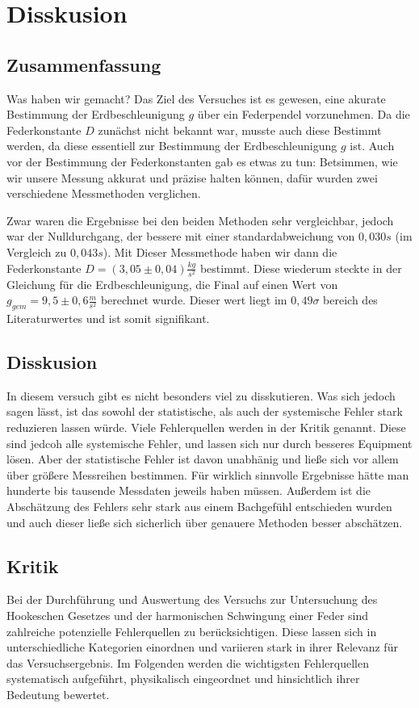 \chapter{Disskusion}

\section{Zusammenfassung}
Was haben wir gemacht? Das Ziel des Versuches ist es gewesen, eine akurate Bestimmung der Erdbeschleunigung $g$ über ein Federpendel vorzunehmen. 
Da die Federkonstante $D$ zunächst nicht bekannt war, musste auch diese Bestimmt werden, da diese essentiell zur Bestimmung der Erdbeschleunigung $g$ ist.
Auch vor der Bestimmung der Federkonstanten gab es etwas zu tun: Betsimmen, wie wir unsere Messung akkurat und präzise halten können, dafür wurden zwei verschiedene Messmethoden verglichen.

Zwar waren die Ergebnisse bei den beiden Methoden sehr vergleichbar, jedoch war der Nulldurchgang, der bessere mit einer standardabweichung von $0,030s$ (im Vergleich zu $0,043s$). 
Mit Dieser Messmethode haben wir dann die Federkonstante $D = (3,05 \pm 0,04) \frac{kg}{s^2}$ bestimmt. 
Diese wiederum steckte in der Gleichung für die Erdbeschleunigung, die Final auf einen Wert von $g_{gem} = 9,5 \pm 0,6 \frac{m}{s^2}$ berechnet wurde.
Dieser wert liegt im $0,49 \sigma$ bereich des Literaturwertes und ist somit signifikant.

\section{Disskusion}
In diesem versuch gibt es nicht besonders viel zu disskutieren. Was sich jedoch sagen lässt, ist das sowohl der statistische, als auch der systemische Fehler stark reduzieren lassen würde. Viele Fehlerquellen werden in der Kritik genannt.
Diese sind jedcoh alle systemische Fehler, und lassen sich nur durch besseres Equipment lösen. Aber der statistische Fehler ist davon unabhänig und ließe sich vor allem über größere Messreihen bestimmen. Für wirklich sinnvolle Ergebnisse 
hätte man hunderte bis tausende Messdaten jeweils haben müssen. Außerdem ist die Abschätzung des Fehlers sehr stark aus einem Bachgefühl entschieden wurden und auch dieser ließe sich sicherlich über genauere Methoden besser abschätzen.

\section{Kritik}
Bei der Durchführung und Auswertung des Versuchs zur Untersuchung des Hookeschen Gesetzes und der harmonischen Schwingung einer Feder sind zahlreiche potenzielle Fehlerquellen zu berücksichtigen. Diese lassen sich in unterschiedliche Kategorien einordnen und variieren stark in ihrer Relevanz für das Versuchsergebnis. Im Folgenden werden die wichtigsten Fehlerquellen systematisch aufgeführt, physikalisch eingeordnet und hinsichtlich ihrer Bedeutung bewertet.

